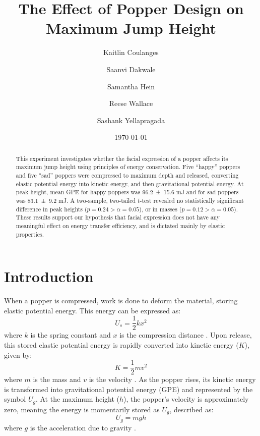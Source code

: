 \documentclass[amsmath,amssymb,aps, endfloats, linenumbers]{revtex4-2}
\begin{document}
\title{The Effect of Popper Design on Maximum Jump Height}

\author{Kaitlin Coulanges}
\author{Saanvi Dakwale}
\author{Samantha Hein}
\author{Reese Wallace}
\author{Sashank Yellapragada}

\date{\today}

\begin{abstract}
This experiment investigates whether the facial expression of a popper affects its maximum jump height using principles of energy conservation. Five ``happy'' poppers and five ``sad'' poppers were compressed to maximum depth and released, converting elastic potential energy into kinetic energy, and then gravitational potential energy. At peak height, mean GPE for happy poppers was \num{96.2 \pm 15.6} \unit{\milli\joule} and for sad poppers was \num{83.1 \pm 9.2} \unit{\milli\joule}. A two-sample, two-tailed $t$-test revealed no statistically significant difference in peak heights ($p = 0.24 > \alpha = 0.05$), or in masses ($p = 0.12 > \alpha = 0.05$). These results support our hypothesis that facial expression does not have any meaningful effect on energy transfer efficiency, and is dictated mainly by elastic properties.
\end{abstract}


\maketitle\thispagestyle{mytitlepage}
\section{Introduction}
When a popper is compressed, work is done to deform the material, storing elastic potential energy. This energy can be expressed as: 
\begin{equation}
U_s = \frac{1}{2}kx^2 
\label{eq:epe}
\end{equation}
where $k$ is the spring constant and $x$ is the compression distance \cite{tipler}. Upon release, this stored elastic potential energy is rapidly converted into kinetic energy ($K$), given by:
\begin{equation}
K = \frac{1}{2}mv^2 
\label{eq:ke}
\end{equation}
where $m$ is the mass and $v$ is the velocity \cite{tipler}. As the popper rises, its kinetic energy is transformed into gravitational potential energy (GPE) and represented by the symbol $U_g$. At the maximum height ($h$), the popper’s velocity is approximately zero, meaning the energy is momentarily stored as $U_g$, described as: 
\begin{equation}
U_g = mgh
\label{eq:gpe}
\end{equation}
where $g$ is the acceleration due to gravity \cite{tipler}.
\end{document}
